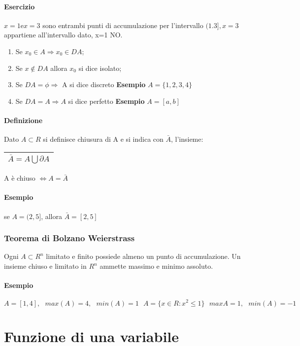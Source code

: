 \documentclass{book}
\begin{document}
\paragraph{Esercizio} $x=1 \text{e} x=3$ sono entrambi punti di accumulazione
per l'intervallo $(1.3],x=3$ appartiene all'intervallo dato, x=1 NO.
\begin{enumerate}
	\item Se $x_0\in A \Rightarrow x_0\in DA$;
	\item Se $x\notin DA$ allora $x_0$ si dice isolato;
	\item Se $DA=\phi\Rightarrow$ A si dice discreto \textbf{Esempio}
		$A=\{1,2,3,4\}$
	\item Se $DA=A\Rightarrow A$ si dice perfetto \textbf{Esempio} $A=[a,b]$
\end{enumerate}
\paragraph{Definizione}
Dato $A\subset R$ si definisce chiusura di A e si indica con $\bar{A}$,
l'insieme:
\begin{tabular}{|c|}
	\hline
	$\bar{A}=A\bigcup \partial A$\\
	\hline
\end{tabular} A è chiuso $\Leftrightarrow A=\bar{A}$
\paragraph{Esempio} se $A=(2,5]$, allora $\bar{A}=[2,5]$
\subsubsection{Teorema di Bolzano Weierstrass}
Ogni $A\subset R^n$ limitato e finito possiede almeno un punto di
accumulazione. Un insieme chiuso e limitato in $R^n$ ammette massimo e minimo
assoluto.
\paragraph{Esempio} $A=[1,4],\text{ } max(A)=4,\text{ } min(A)=1 \text{ }
A=\{x\in R:x^2\leq 1\} \text{ } max{A}=1, \text{ } min(A)=-1$
\section{Funzione di una variabile}
\end{document}
